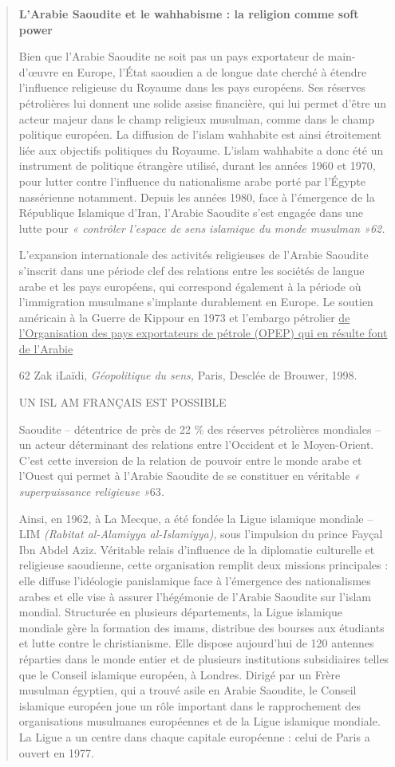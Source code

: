 \begin{quote}
\textbf{L'Arabie Saoudite et le wahhabisme : la religion comme soft
power}

Bien que l'Arabie Saoudite ne soit pas un pays exportateur de
main-d'œuvre en Europe, l'État saoudien a de longue date cherché à
étendre l'influence religieuse du Royaume dans les pays européens. Ses
réserves pétrolières lui donnent une solide assise financière, qui lui
permet d'être un acteur majeur dans le champ religieux musulman, comme
dans le champ politique européen. La diffusion de l'islam wahhabite est
ainsi étroitement liée aux objectifs politiques du Royaume. L'islam
wahhabite a donc été un instrument de politique étrangère utilisé,
durant les années 1960 et 1970, pour lutter contre l'influence du
nationalisme arabe porté par l'Égypte nassérienne notamment. Depuis les
années 1980, face à l'émergence de la République Islamique d'Iran,
l'Arabie Saoudite s'est engagée dans une lutte pour \emph{« contrôler
l'espace de sens islamique du monde musulman »62.}

L'expansion internationale des activités religieuses de l'Arabie
Saoudite s'inscrit dans une période clef des relations entre les
sociétés de langue arabe et les pays européens, qui correspond également
à la période où l'immigration musulmane s'implante durablement en
Europe. Le soutien américain à la Guerre de Kippour en 1973 et l'embargo
pétrolier \underline{de l'Organisation des pays exportateurs de pétrole
(OPEP) qui en résulte font de l'Arabie}

62 Zak iLaïdi, \emph{Géopolitique du sens,} Paris, Desclée de Brouwer,
1998.

UN ISL AM FRANÇAIS EST POSSIBLE

Saoudite -- détentrice de près de 22 \% des réserves pétrolières
mondiales -- un acteur déterminant des relations entre l'Occident et le
Moyen-Orient. C'est cette inversion de la relation de pouvoir entre le
monde arabe et l'Ouest qui permet à l'Arabie Saoudite de se constituer
en véritable \emph{« superpuissance religieuse »}63\emph{.}

Ainsi, en 1962, à La Mecque, a été fondée la Ligue islamique mondiale --
LIM \emph{(Rabitat al-Alamiyya al-Islamiyya)}, sous l'impulsion du
prince Fayçal Ibn Abdel Aziz. Véritable relais d'influence de la
diplomatie culturelle et religieuse saoudienne, cette organisation
remplit deux missions principales : elle diffuse l'idéologie
panislamique face à l'émergence des nationalismes arabes et elle vise à
assurer l'hégémonie de l'Arabie Saoudite sur l'islam mondial. Structurée
en plusieurs départements, la Ligue islamique mondiale gère la formation
des imams, distribue des bourses aux étudiants et lutte contre le
christianisme. Elle dispose aujourd'hui de 120 antennes réparties dans
le monde entier et de plusieurs institutions subsidiaires telles que le
Conseil islamique européen, à Londres. Dirigé par un Frère musulman
égyptien, qui a trouvé asile en Arabie Saoudite, le Conseil islamique
européen joue un rôle important dans le rapprochement des organisations
musulmanes européennes et de la Ligue islamique mondiale. La Ligue a un
centre dans chaque capitale européenne : celui de Paris a ouvert en
1977.


\end{quote}
